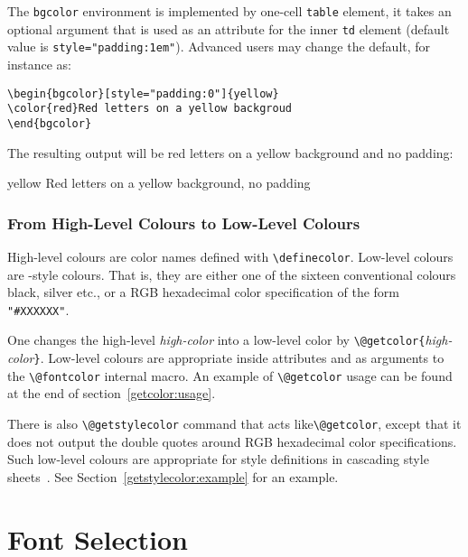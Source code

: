 The \texttt{bgcolor} environment is implemented by one-cell
\verb+table+ element, it takes an
optional argument that is used as an attribute for the inner \verb+td+
element (default value is \verb+style="padding:1em"+).
Advanced users may change the default, for instance as:
\begin{verbatim}
\begin{bgcolor}[style="padding:0"]{yellow}
\color{red}Red letters on a yellow backgroud
\end{bgcolor}
\end{verbatim}
The resulting output will be red letters
on a yellow background and no padding:
\begin{htmlonly}
\begin{bgcolor}[style="padding:0"]{yellow}
\color{red}Red letters on a yellow background, no padding
\end{bgcolor}
\end{htmlonly}


\subsubsection{From High-Level Colours to Low-Level Colours}\label{getcolor}
High-level colours are color names
defined with \verb+\definecolor+.
Low-level colours are \html-style colours.
That is, they are either one of the sixteen conventional colours black,
silver etc., or a RGB hexadecimal color specification of the form
\verb+"#XXXXXX"+.


One changes the high-level \emph{high-color} into a low-level color by
\verb+\@getcolor{+\emph{high-color}\verb+}+.
Low-level colours are appropriate inside \html{} attributes and as
arguments to the \verb+\@fontcolor+ internal macro.
An example of \verb+\@getcolor+ usage can be found at the end of
section~\ref{getcolor:usage}.

There is also \verb+\@getstylecolor+ command that acts
like\verb+\@getcolor+, except that it does not output the double
quotes around RGB hexadecimal color specifications.
Such low-level colours are appropriate for style definitions in
cascading style sheets~\cite{css}. See
Section~\ref{getstylecolor:example} for an example.


\section{Font Selection}


